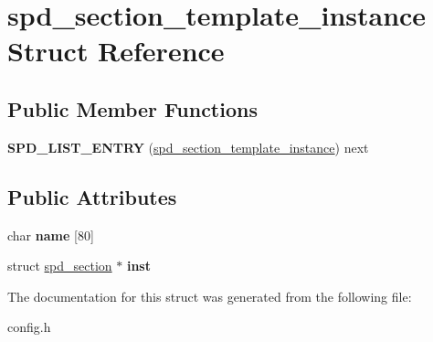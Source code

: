 \hypertarget{structspd__section__template__instance}{
\section{spd\_\-section\_\-template\_\-instance Struct Reference}
\label{structspd__section__template__instance}
}
\subsection*{Public Member Functions}
\begin{DoxyCompactItemize}
\item 
\hypertarget{structspd__section__template__instance_aaa991cc710c8be6fadab54d7ea23f715}{
{\bfseries SPD\_\-LIST\_\-ENTRY} (\hyperlink{structspd__section__template__instance}{spd\_\-section\_\-template\_\-instance}) next}
\label{structspd__section__template__instance_aaa991cc710c8be6fadab54d7ea23f715}

\end{DoxyCompactItemize}
\subsection*{Public Attributes}
\begin{DoxyCompactItemize}
\item 
\hypertarget{structspd__section__template__instance_a20d45e214c8ac3518be70b0c279b9d36}{
char {\bfseries name} \mbox{[}80\mbox{]}}
\label{structspd__section__template__instance_a20d45e214c8ac3518be70b0c279b9d36}

\item 
\hypertarget{structspd__section__template__instance_a5fbf42000748beab42ea5e9b1565fcc0}{
struct \hyperlink{structspd__section}{spd\_\-section} $\ast$ {\bfseries inst}}
\label{structspd__section__template__instance_a5fbf42000748beab42ea5e9b1565fcc0}

\end{DoxyCompactItemize}


The documentation for this struct was generated from the following file:\begin{DoxyCompactItemize}
\item 
config.h\end{DoxyCompactItemize}
